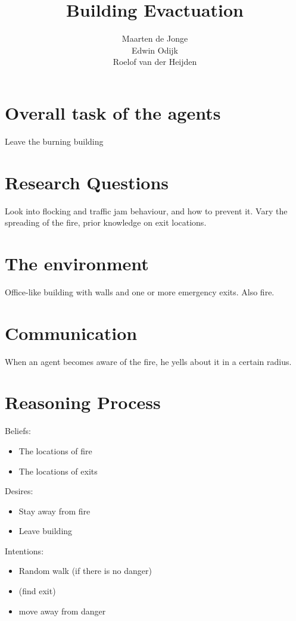 \documentclass[a4paper]{article}
\title{Building Evactuation}
\author{Maarten de Jonge \\
        Edwin Odijk \\
        Roelof van der Heijden}
\begin{document}
\maketitle

\section{Overall task of the agents}
Leave the burning building

\section{Research Questions}
Look into flocking and traffic jam behaviour, and how to prevent it.
Vary the spreading of the fire, prior knowledge on exit locations.

\section{The environment}
Office-like building with walls and one or more emergency exits.
Also fire.

\section{Communication}
When an agent becomes aware of the fire, he yells about it in a certain radius.

\section{Reasoning Process}
Beliefs:
\begin{itemize}
  \item The locations of fire
  \item The locations of exits
\end{itemize}

Desires:
\begin{itemize}
  \item Stay away from fire
  \item Leave building
\end{itemize}

Intentions:
\begin{itemize}
  \item Random walk (if there is no danger)
  \item (find exit)
  \item move away from danger
\end{itemize}
\end{document}

